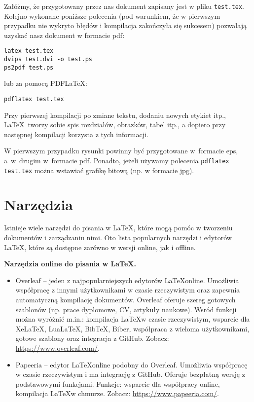 Załóżmy, że przygotowany przez nas dokument zapisany jest w pliku \texttt{test.tex}. Kolejno wykonane poniższe polecenia (pod warunkiem, że w pierwszym przypadku nie wykryto błędów i kompilacja zakończyła się sukcesem) pozwalają uzyskać nasz dokument w formacie pdf:
\begin{lstlisting}
latex test.tex
dvips test.dvi -o test.ps
ps2pdf test.ps
\end{lstlisting}
%
lub za pomocą PDF\LaTeX:
\begin{lstlisting}
pdflatex test.tex
\end{lstlisting}

Przy pierwszej kompilacji po zmiane tekstu, dodaniu nowych etykiet itp., \LaTeX~tworzy sobie spis rozdziałów, obrazków, tabel itp., a dopiero przy następnej kompilacji korzysta z tych informacji.

W pierwszym przypadku rysunki powinny być przygotowane w~formacie eps, a~w~drugim w~formacie pdf. Ponadto, jeżeli używamy polecenia \texttt{pdflatex test.tex} można wstawiać grafikę bitową (np. w formacie jpg).


\section{Narzędzia}
\label{sec:narzedzia}

Istnieje wiele narzędzi do pisania w \LaTeX, które mogą pomóc w tworzeniu dokumentów i zarządzaniu nimi. Oto lista popularnych narzędzi i edytorów \LaTeX, które są dostępne zarówno w wersji online, jak i offline.

\noindent \textbf{Narzędzia online do pisania w \LaTeX.}
\begin{itemize}
      \item Overleaf -- jeden z najpopularniejszych edytorów \LaTeX online. Umożliwia współpracę z innymi użytkownikami w czasie rzeczywistym oraz zapewnia automatyczną kompilację dokumentów. Overleaf oferuje szereg gotowych szablonów (np. prace dyplomowe, CV, artykuły naukowe). Wsród funkcji można wyróżnić m.in.: kompilacja \LaTeX w czasie rzeczywistym, wsparcie dla XeLaTeX, LuaLaTeX, BibTeX, Biber, współpraca z wieloma użytkownikami, gotowe szablony oraz integracja z GitHub. Zobacz: \url{https://www.overleaf.com/}.
      \item Papeeria -- edytor \LaTeX online podobny do Overleaf. Umożliwia współpracę w czasie rzeczywistym i ma integrację z GitHub. Oferuje bezpłatną wersję z podstawowymi funkcjami. Funkcje: wsparcie dla współpracy online, kompilacja \LaTeX w chmurze. Zobacz: \url{https://www.papeeria.com/}.
\end{itemize}


